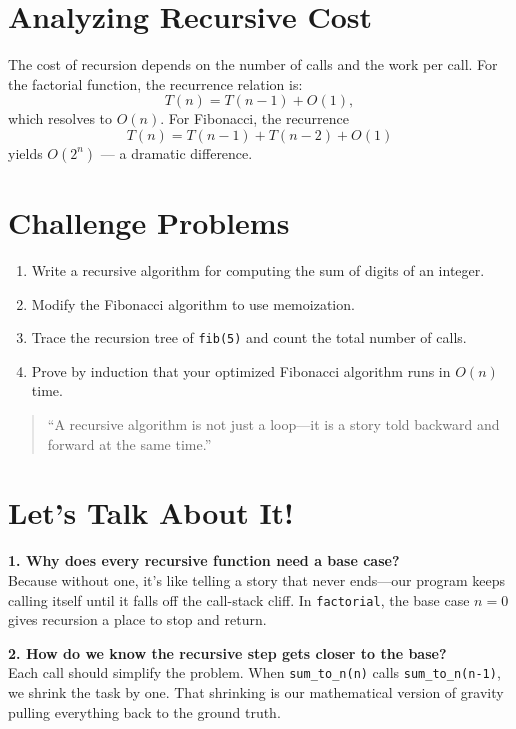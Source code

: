 \section{Analyzing Recursive Cost}

The cost of recursion depends on the number of calls and the work per call.
For the factorial function, the recurrence relation is:
\[
T(n) = T(n-1) + O(1),
\]
which resolves to $O(n)$.
For Fibonacci, the recurrence
\[
T(n) = T(n-1) + T(n-2) + O(1)
\]
yields $O(2^n)$ — a dramatic difference.

\section{Challenge Problems}

\begin{enumerate}
  \item Write a recursive algorithm for computing the sum of digits of an integer.
  \item Modify the Fibonacci algorithm to use memoization.  
  \item Trace the recursion tree of \texttt{fib(5)} and count the total number of calls.
  \item Prove by induction that your optimized Fibonacci algorithm runs in $O(n)$ time.
\end{enumerate}

\begin{quote}
``A recursive algorithm is not just a loop—it is a story told backward and forward at the same time.''
\end{quote}

\newpage

\section*{Let’s Talk About It!}

\textbf{1. Why does every recursive function need a base case?}\\
Because without one, it’s like telling a story that never ends—our program keeps calling itself until it falls off the call-stack cliff.  
In \texttt{factorial}, the base case $n=0$ gives recursion a place to stop and return.  

\vspace{0.8em}
\textbf{2. How do we know the recursive step gets closer to the base?}\\
Each call should simplify the problem.  
When \texttt{sum\_to\_n(n)} calls \texttt{sum\_to\_n(n-1)}, we shrink the task by one.  
That shrinking is our mathematical version of gravity pulling everything back to the ground truth.  

